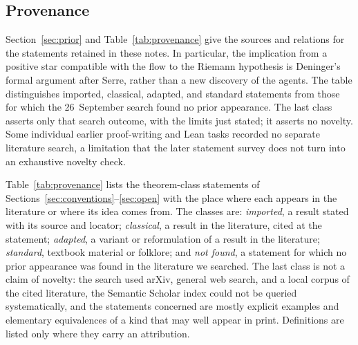 \documentclass[11pt]{amsart}
\theoremstyle{plain}
\theoremstyle{definition}
\theoremstyle{remark}
\numberwithin{equation}{section}
\begin{document}
\subsection{Provenance}
\label{subsec:provenance}
Section~\ref{sec:prior} and Table~\ref{tab:provenance} give the sources and
relations for the statements retained in these notes. In particular,
the implication from a positive star compatible with the flow to the
Riemann hypothesis is Deninger's formal argument after Serre, rather
than a new discovery of the agents. The table distinguishes imported,
classical, adapted, and standard statements from those for which the
26~September search found no prior appearance. The last class asserts
only that search outcome, with the limits just stated; it asserts no
novelty. Some individual earlier proof-writing and Lean tasks recorded
no separate literature search, a limitation that the later statement
survey does not turn into an exhaustive novelty check.

Table~\ref{tab:provenance} lists the theorem-class statements of
Sections~\ref{sec:conventions}--\ref{sec:open} with the place where
each appears in the literature or where its idea comes from. The
classes are: \emph{imported}, a result stated with its source and
locator; \emph{classical}, a result in the literature, cited at the
statement; \emph{adapted}, a variant or reformulation of a result in
the literature; \emph{standard}, textbook material or folklore; and
\emph{not found}, a statement for which no prior appearance was found
in the literature we searched. The last class is not a claim of
novelty: the search used arXiv, general web search, and a local corpus
of the cited literature, the Semantic Scholar index could not be
queried systematically, and the statements concerned are mostly
explicit examples and elementary equivalences of a kind that may well
appear in print. Definitions are listed only where they carry an
attribution.
\end{document}
